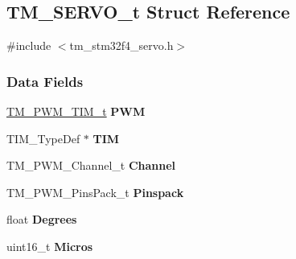 \hypertarget{struct_t_m___s_e_r_v_o__t}{}\subsection{T\+M\+\_\+\+S\+E\+R\+V\+O\+\_\+t Struct Reference}
\label{struct_t_m___s_e_r_v_o__t}


{\ttfamily \#include $<$tm\+\_\+stm32f4\+\_\+servo.\+h$>$}

\subsubsection*{Data Fields}
\begin{DoxyCompactItemize}
\item 
\hypertarget{struct_t_m___s_e_r_v_o__t_a55b538859ff0348d5166029f1580ab3b}{}\hyperlink{struct_t_m___p_w_m___t_i_m__t}{T\+M\+\_\+\+P\+W\+M\+\_\+\+T\+I\+M\+\_\+t} {\bfseries P\+W\+M}\label{struct_t_m___s_e_r_v_o__t_a55b538859ff0348d5166029f1580ab3b}

\item 
\hypertarget{struct_t_m___s_e_r_v_o__t_ae84f988a5d19bcf60544a3d0934ccf02}{}T\+I\+M\+\_\+\+Type\+Def $\ast$ {\bfseries T\+I\+M}\label{struct_t_m___s_e_r_v_o__t_ae84f988a5d19bcf60544a3d0934ccf02}

\item 
\hypertarget{struct_t_m___s_e_r_v_o__t_aed442bcdf7640475d8988e0d0ce0a8e1}{}T\+M\+\_\+\+P\+W\+M\+\_\+\+Channel\+\_\+t {\bfseries Channel}\label{struct_t_m___s_e_r_v_o__t_aed442bcdf7640475d8988e0d0ce0a8e1}

\item 
\hypertarget{struct_t_m___s_e_r_v_o__t_a596fbed3442104f025484da2cb62a489}{}T\+M\+\_\+\+P\+W\+M\+\_\+\+Pins\+Pack\+\_\+t {\bfseries Pinspack}\label{struct_t_m___s_e_r_v_o__t_a596fbed3442104f025484da2cb62a489}

\item 
\hypertarget{struct_t_m___s_e_r_v_o__t_ac2d64e2d56da07161e18228b0d523bcb}{}float {\bfseries Degrees}\label{struct_t_m___s_e_r_v_o__t_ac2d64e2d56da07161e18228b0d523bcb}

\item 
\hypertarget{struct_t_m___s_e_r_v_o__t_af04a8448bbcff72983abc7d9be5b4c81}{}uint16\+\_\+t {\bfseries Micros}\label{struct_t_m___s_e_r_v_o__t_af04a8448bbcff72983abc7d9be5b4c81}

\end{DoxyCompactItemize}


